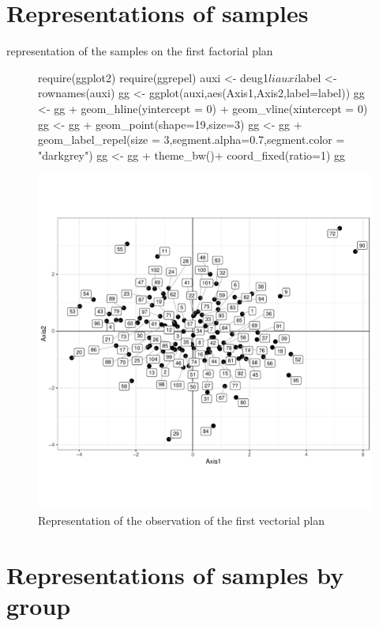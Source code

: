 \documentclass[a4paper,10pt]{article}
\begin{document}
\section{Representations of samples}

representation of the samples on the first factorial plan

\begin{figure}[H]
\begin{center}
\begin{Schunk}
\begin{Sinput}
  require(ggplot2)
  require(ggrepel)
  auxi <- deug1$li
  auxi$label <- rownames(auxi)
  gg <- ggplot(auxi,aes(Axis1,Axis2,label=label))
  gg <- gg + geom_hline(yintercept = 0) + geom_vline(xintercept = 0)
  gg <- gg + geom_point(shape=19,size=3)
  gg <- gg + geom_label_repel(size = 3,segment.alpha=0.7,segment.color = "darkgrey")
  gg <-  gg + theme_bw()+ coord_fixed(ratio=1)
  gg
\end{Sinput}
\end{Schunk}
\includegraphics{figs/sweave-lilabel}
\caption{Representation of the observation of the first vectorial plan}
\label{fig:lilabel}
\end{center}
\end{figure}


\section{Representations of samples by group}
\end{document}
